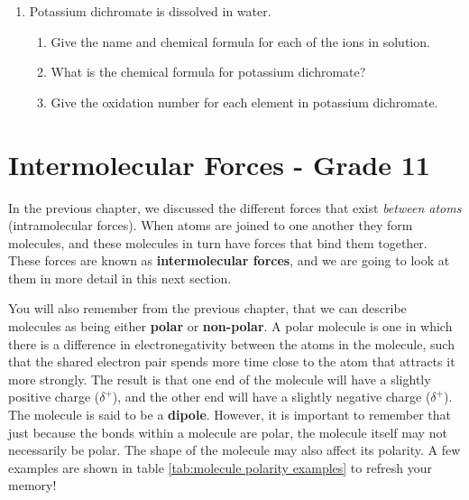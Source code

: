 {\begin{enumerate}
\item{Potassium dichromate is dissolved in water.}
	\begin{enumerate}
	\item{Give the name and chemical formula for each of the ions in solution.}
	\item{What is the chemical formula for potassium dichromate?}
	\item{Give the oxidation number for each element in potassium dichromate.}
	\end{enumerate}

\end{enumerate}
}









\chapter{Intermolecular Forces - Grade 11}
\label{chap:intermolecular}

In the previous chapter, we discussed the different forces that exist \textit{between atoms} (intramolecular forces). When atoms are joined to one another they form molecules, and these molecules in turn have forces that bind them together. These forces are known as \textbf{intermolecular forces}, and we are going to look at them in more detail in this next section.


You will also remember from the previous chapter, that we can describe molecules as being either \textbf{polar} or \textbf{non-polar}. A polar molecule is one in which there is a difference in electronegativity between the atoms in the molecule, such that the shared electron pair spends more time close to the atom that attracts it more strongly. The result is that one end of the molecule will have a slightly positive charge ($\delta^{+}$), and the other end will have a slightly negative charge ($\delta^{+}$). The molecule is said to be a \textbf{dipole}. However, it is important to remember that just because the bonds within a molecule are polar, the molecule itself may not necessarily be polar. The shape of the molecule may also affect its polarity. A few examples are shown in table \ref{tab:molecule polarity examples} to refresh your memory!

